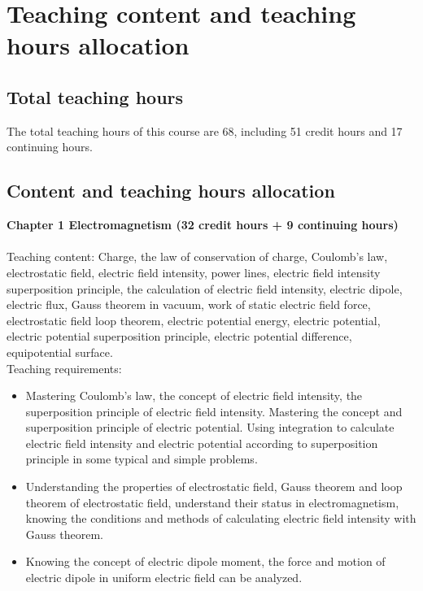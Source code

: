 \documentclass[10pt,a4paper,oneside]{article}
\begin{document}
\section{Teaching content and teaching hours allocation }
\subsection{Total teaching hours}
The total teaching hours of this course are 68, including 51 credit hours and 17 continuing hours.
\subsection{Content and teaching hours allocation}
{\bfseries Chapter 1 Electromagnetism (32 credit hours + 9 continuing hours)}\\

\\

Teaching content: Charge, the law of conservation of charge, Coulomb's law, electrostatic field, electric field intensity, power lines, electric field intensity superposition principle, the calculation of electric field intensity, electric dipole, electric flux, Gauss theorem in vacuum, work of static electric field force, electrostatic field loop theorem, electric potential energy, electric potential, electric potential superposition principle, electric potential difference, equipotential surface.\\

Teaching requirements:
\begin{itemize}
\item Mastering Coulomb's law, the concept of electric field intensity, the superposition principle of electric field intensity. Mastering the concept and superposition principle of electric potential. Using integration to calculate electric field intensity and electric potential according to superposition principle in some typical and simple problems.
\item Understanding the properties of electrostatic field, Gauss theorem and loop theorem of electrostatic field, understand their status in electromagnetism, knowing the conditions and methods of calculating electric field intensity with Gauss theorem.
\item Knowing the concept of electric dipole moment, the force and motion of electric dipole in uniform electric field can be analyzed.
\end{itemize}
\\
\end{document}
